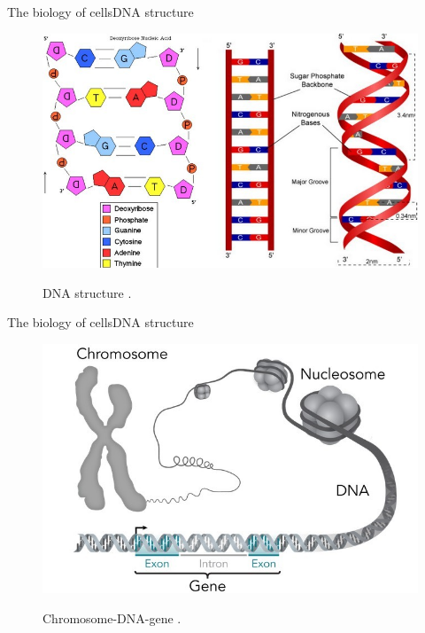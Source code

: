 \documentclass[10pt]{beamer}
\begin{document}
{%
\begin{frame}{The biology of cells}{DNA structure}
\begin{figure}[]
 \centering
    \includegraphics[width=\textwidth,height=0.7\textheight,keepaspectratio]{img/introduction/bio7.jpg}
    \label{img:mot2}
    \caption{DNA structure \cite{dnastructure2020}.}
\end{figure}
\end{frame}

\begin{frame}{The biology of cells}{DNA structure}
\begin{figure}[]
 \centering
    \includegraphics[width=\textwidth,height=0.6\textheight,keepaspectratio]{img/introduction/bio8.jpg}
    \label{img:mot2}
    \caption{Chromosome-DNA-gene \cite{dnacromosome2020}.}
\end{figure}
\end{frame}

}
\end{document}
